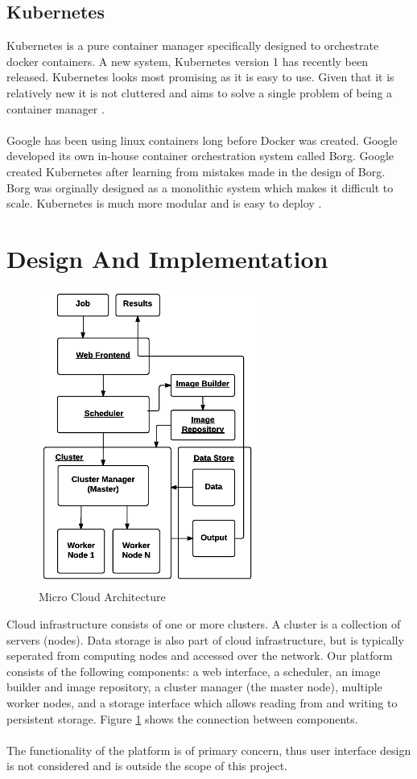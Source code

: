 \documentclass{sig-alternate-05-2015}
\begin{document}
\subsection{Kubernetes}
Kubernetes is a pure container manager specifically designed to orchestrate docker containers. A new system, Kubernetes version 1 has recently been released. Kubernetes looks most promising as it is easy to use. Given that it is relatively new it is not cluttered and aims to solve a single problem of being a container manager \cite{googleborg}. 
\\\\
Google has been using linux containers long before Docker was created. Google developed its own in-house container orchestration system called Borg. Google created Kubernetes after learning from mistakes made in the design of Borg. Borg was orginally designed as a monolithic system which makes it difficult to scale. Kubernetes is much more modular and is easy to deploy \cite{googleborg}.


\section{Design And Implementation}

\begin{figure}
\centering
\includegraphics[scale=0.8]{img/microcloud_architecture}
\caption{Micro Cloud Architecture}
\label{fig:architecture}
\end{figure}

Cloud infrastructure consists of one or more clusters. A cluster is a collection of servers (nodes). Data storage is also part of cloud infrastructure, but is typically seperated from computing nodes and accessed over the network. Our platform consists of the following components: a web interface, a scheduler, an image builder and image repository, a cluster manager (the master node), multiple worker nodes, and a storage interface which allows reading from and writing to persistent storage. Figure \ref{fig:architecture} shows the connection between components.
\\\\
The functionality of the platform is of primary concern, thus user interface design is not considered and is outside the scope of this project. 
\end{document}
